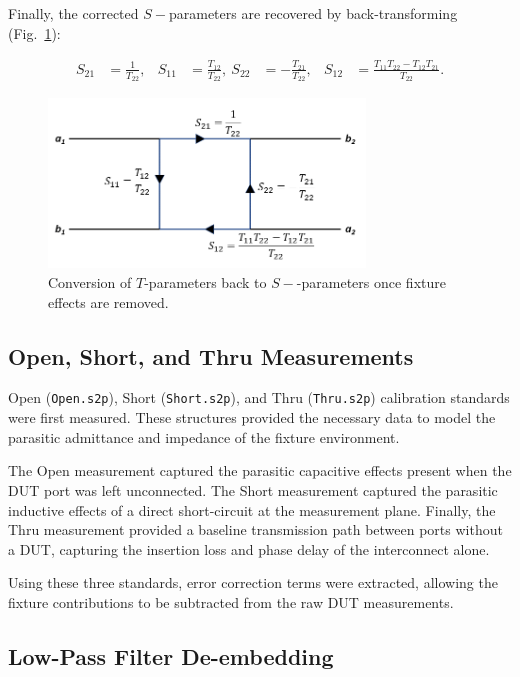 Finally, the corrected $S-$parameters are recovered by back-transforming (Fig.~\ref{Ch8_fig:4}):

\begin{align}
S_{21} &= \frac{1}{T_{22}}, & S_{11} &= \frac{T_{12}}{T_{22}},\
S_{22} &= -\frac{T_{21}}{T_{22}}, & S_{12} &= \frac{T_{11}T_{22}-T_{12}T_{21}}{T_{22}}.
\end{align}

\begin{figure}[H]
\centering
\includegraphics[width=0.75\textwidth]{Chapter_8/images/Lab_08_Figure5.png}
\caption{Conversion of $T$-parameters back to $S-$-parameters once fixture effects are removed. \cite{deembedding_part1}}
\label{Ch8_fig:4}
\end{figure}
\FloatBarrier


\subsection{Open, Short, and Thru Measurements}
\justifying

Open (\texttt{Open.s2p}), Short (\texttt{Short.s2p}), and Thru (\texttt{Thru.s2p}) calibration standards were first measured. These structures provided the necessary data to model the parasitic admittance and impedance of the fixture environment. 

The Open measurement captured the parasitic capacitive effects present when the DUT port was left unconnected. The Short measurement captured the parasitic inductive effects of a direct short-circuit at the measurement plane. Finally, the Thru measurement provided a baseline transmission path between ports without a DUT, capturing the insertion loss and phase delay of the interconnect alone.

Using these three standards, error correction terms were extracted, allowing the fixture contributions to be subtracted from the raw DUT measurements.

\subsection{Low-Pass Filter De-embedding}
\justifying

